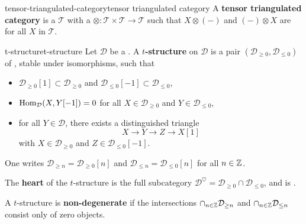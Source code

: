 \begin{topic}{tensor-triangulated-category}{tensor triangulated category}
    A \textbf{tensor triangulated category} is a  $\mathcal{T}$ with a  $\otimes \colon \mathcal{T} \times \mathcal{T} \to \mathcal{T}$ such that $X \otimes (-)$ and $(-) \otimes X$ are  for all $X$ in $\mathcal{T}$.
\end{topic}

\begin{topic}{t-structure}{t-structure}
    Let $\mathcal{D}$ be a . A \textbf{$t$-structure} on $\mathcal{D}$ is a pair $(\mathcal{D}_{\ge 0}, \mathcal{D}_{\le 0})$ of , stable under isomorphisms, such that
    \begin{itemize}
        \item $\mathcal{D}_{\ge 0}[1] \subset \mathcal{D}_{\ge 0}$ and $\mathcal{D}_{\le 0}[-1] \subset \mathcal{D}_{\le 0}$,
        \item $\operatorname{Hom}_\mathcal{D}(X, Y[-1]) = 0$ for all $X \in \mathcal{D}_{\ge 0}$ and $Y \in \mathcal{D}_{\le 0}$,
        \item for all $Y \in \mathcal{D}$, there exists a distinguished triangle
        \[ X \to Y \to Z \to X[1] \]
        with $X \in \mathcal{D}_{\ge 0}$ and $Z \in \mathcal{D}_{\le 0}[-1]$.
    \end{itemize}
    One writes $\mathcal{D}_{\ge n} = \mathcal{D}_{\ge 0}[n]$ and $\mathcal{D}_{\le n} = \mathcal{D}_{\le 0}[n]$ for all $n \in \mathbb{Z}$.
    
    The \textbf{heart} of the $t$-structure is the full subcategory $\mathcal{D}^\heartsuit = \mathcal{D}_{\ge 0} \cap \mathcal{D}_{\le 0}$, and is .
    
    A $t$-structure is \textbf{non-degenerate} if the intersections $\cap_{n \in \mathbb{Z}} \mathcal{D}_{\ge n}$ and $\cap_{n \in \mathbb{Z}} \mathcal{D}_{\le n}$ consist only of zero objects.
\end{topic}


